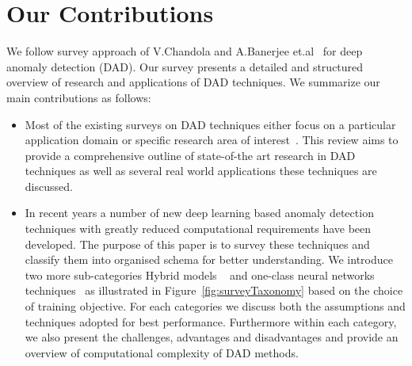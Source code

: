 \section{ Our Contributions}
We follow survey approach of V.Chandola and A.Banerjee et.al~\cite{chandola2007outlier} for deep  anomaly detection (DAD). Our survey presents a detailed and structured overview of research and applications of DAD techniques. We summarize our main contributions as follows:
\begin{itemize}
\item Most of the existing surveys on DAD techniques either focus on a particular
application domain or specific research area of interest~\cite{kiran2018overview,mohammadi2017deep,litjens2017survey,kwon2017survey,adewumi2017survey,ball2017comprehensive}.
This review aims to provide a comprehensive outline of state-of-the art research in DAD techniques as well as several real world applications these techniques are discussed.
\item In recent years a number of new deep learning based anomaly detection techniques  with greatly reduced computational requirements have been developed. The purpose of this paper is to survey these techniques and classify them into organised schema for better understanding. We introduce two more sub-categories Hybrid models ~\cite{erfani2016high} and one-class neural networks techniques~\cite{chalapathy2018anomaly} as illustrated in Figure~\ref{fig:surveyTaxonomy} based on the choice of training objective. For each categories we discuss both the assumptions and techniques adopted for best performance. Furthermore within each category, we also present the challenges, advantages and disadvantages and provide an overview of computational complexity of DAD methods.
\end{itemize}

